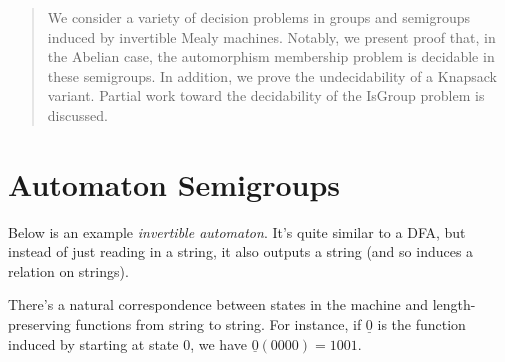 \documentclass[a0]{a0poster}
\theoremstyle{pleasant}
\newcommand{\0}{\underline{0}}
\newcommand{\1}{\underline{1}}
\newcommand{\2}{\underline{2}}
\begin{document}
\begin{multicols}{3} %



\begin{abstract}
\large
  We consider a variety of decision problems in groups and semigroups
  induced by invertible Mealy machines. Notably, we present proof
  that, in the Abelian case, the automorphism membership problem is
  decidable in these semigroups. In addition, we prove the
  undecidability of a Knapsack variant. Partial work toward the
  decidability of the IsGroup problem is discussed.
\end{abstract}

\section*{Automaton Semigroups}

\Large Below is an example \textit{invertible automaton}. It's quite
similar to a DFA, but instead of just reading in a string, it also
outputs a string (and so induces a relation on strings).

\begin{center}
\end{center}
There's a natural correspondence between states in the machine and
length-preserving functions from string to string. For instance, if
$\underline{0}$ is the function induced by starting at state 0, we
have $\underline{0}(0000) = 1001$.


\end{multicols}
\end{document}
